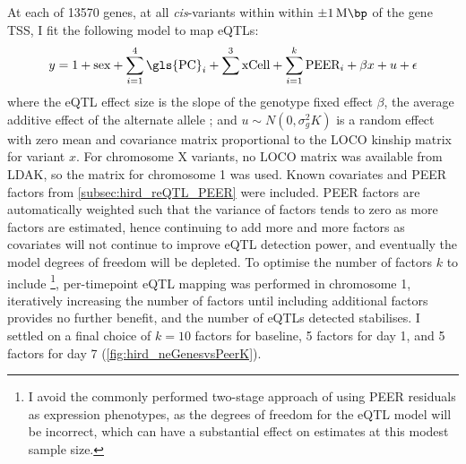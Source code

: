 At each of \num{13570} genes, at all \textit{cis}-variants within within $\pm \SI{1}{\mega\bp}$ of the gene \gls{TSS}, I fit the following model to map \glspl{eQTL}:
\begin{equation}
    \begin{split}
        y = 1 + \text{sex} + \sum_{i=1}^{4}{\text{\gls{PC}}_i} + \sum_{}^{3}{\text{xCell}} + \sum_{i=1}^{k}{\text{PEER}_i} + \beta x + u + \epsilon
    \end{split}
    \label{eq:hird_reQTL_limix_model}
\end{equation}
where the \gls{eQTL} effect size is the slope of the genotype fixed effect $\beta$, the average additive effect of the alternate allele \autocite{visscher2019Fisher1918Paper};
and $u \sim N(0, \sigma_g^2 K)$ is a random effect with zero mean and covariance matrix proportional to the \gls{LOCO} kinship matrix for variant $x$.
For chromosome X variants, no \gls{LOCO} matrix was available from LDAK, so the matrix for chromosome 1 was used.
%
Known covariates and PEER factors from \cref{subsec:hird_reQTL_PEER} were included.
PEER factors are automatically weighted such that the variance of factors tends to zero as more factors are estimated, 
hence continuing to add more and more factors as covariates will not continue to improve \gls{eQTL} detection power, and eventually the model degrees of freedom will be depleted.
To optimise the number of factors $k$ to include%
\footnote{I avoid the commonly performed two-stage approach of using PEER residuals as expression phenotypes, as the degrees of freedom for the \gls{eQTL} model will be incorrect, which can have a substantial effect on estimates at this modest sample size.}, 
per-timepoint \gls{eQTL} mapping was performed in chromosome 1, iteratively increasing the number of factors until including additional factors provides no further benefit, and the number of \glspl{eQTL} detected stabilises.
I settled on a final choice of $k=10$ factors for baseline, 5 factors for day 1, and 5 factors for day 7 (\cref{fig:hird_neGenesvsPeerK}).

